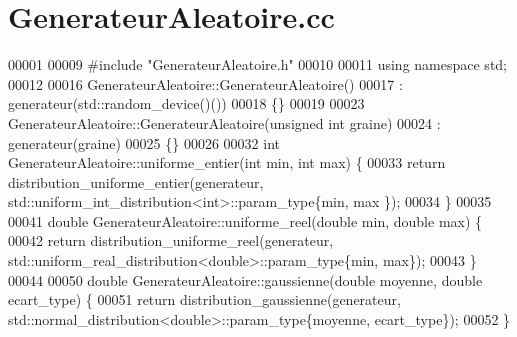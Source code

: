 \section{Generateur\+Aleatoire.\+cc}
\label{_generateur_aleatoire_8cc_source}

\begin{DoxyCode}
00001 
00009 \textcolor{preprocessor}{#include "GenerateurAleatoire.h"}
00010 
00011 \textcolor{keyword}{using namespace }std;
00012 
00016 GenerateurAleatoire::GenerateurAleatoire()
00017  : generateur(std::random\_device()())
00018 \{\}
00019 
00023 GenerateurAleatoire::GenerateurAleatoire(\textcolor{keywordtype}{unsigned} \textcolor{keywordtype}{int} graine)
00024  : generateur(graine)
00025 \{\}
00026 
00032 \textcolor{keywordtype}{int} GenerateurAleatoire::uniforme_entier(\textcolor{keywordtype}{int} min, \textcolor{keywordtype}{int} max) \{
00033     \textcolor{keywordflow}{return} distribution\_uniforme\_entier(generateur, std::uniform\_int\_distribution<int>::param\_type\{min, max
      \});
00034 \}
00035 
00041 \textcolor{keywordtype}{double} GenerateurAleatoire::uniforme_reel(\textcolor{keywordtype}{double} min, \textcolor{keywordtype}{double} max) \{
00042     \textcolor{keywordflow}{return} distribution\_uniforme\_reel(generateur, std::uniform\_real\_distribution<double>::param\_type\{min, 
      max\});
00043 \}
00044 
00050 \textcolor{keywordtype}{double} GenerateurAleatoire::gaussienne(\textcolor{keywordtype}{double} moyenne, \textcolor{keywordtype}{double} ecart\_type) \{
00051     \textcolor{keywordflow}{return} distribution\_gaussienne(generateur, std::normal\_distribution<double>::param\_type\{moyenne, 
      ecart\_type\});
00052 \}
\end{DoxyCode}
